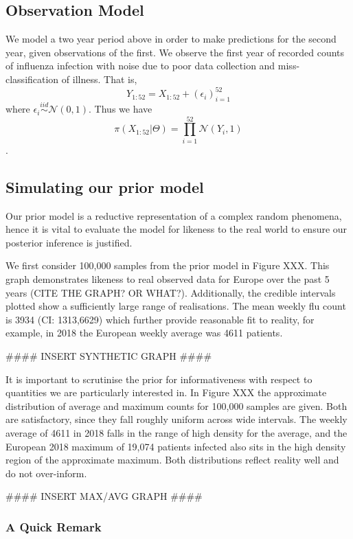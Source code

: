 \documentclass{article}
\begin{document}
\subsection{Observation Model}

We model a two year period above in order to make predictions for the second year, given observations of the first. We observe the first year of recorded counts of influenza infection with noise due to poor data collection and miss-classification of illness. That is,
$$
Y_{1:52} = X_{1:52} + (\epsilon_{i})_{i=1}^{52}
$$
where $\epsilon_{i} \stackrel{iid}{\sim} \mathcal{N}(0,1)$. Thus we have
$$
\pi(X_{1:52}|\Theta) = \prod_{i=1}^{52}\mathcal{N}(Y_{i},1)
$$.

\subsection{Simulating our prior model}

Our prior model is a reductive representation of a complex random phenomena, hence it is vital to evaluate the model for likeness to the real world to ensure our posterior inference is justified. 

We first consider 100,000 samples from the prior model in Figure XXX. This graph demonstrates likeness to real observed data for Europe over the past 5 years (CITE THE GRAPH? OR WHAT?). Additionally, the credible intervals plotted show a sufficiently large range of realisations. The mean weekly flu count is 3934 (CI: 1313,6629) which further provide reasonable fit to reality, for example, in 2018 the European weekly average was 4611 patients.

#### INSERT SYNTHETIC GRAPH ####

It is important to scrutinise the prior for informativeness with respect to quantities we are particularly interested in. In Figure XXX the approximate distribution of average and maximum counts for 100,000 samples are given. Both are satisfactory, since they fall roughly uniform across wide intervals. The weekly average of 4611 in 2018 falls in the range of high density for the average, and the European 2018 maximum of 19,074 patients infected also sits in the high density region of the approximate maximum. Both distributions reflect reality well and do not over-inform. 

#### INSERT MAX/AVG GRAPH ####

\subsubsection{A Quick Remark}
\end{document}
